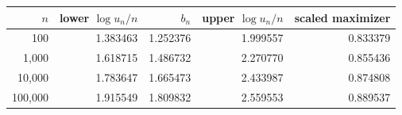 \begin{tabular}{rrrrr}
\toprule
$n$ & lower $\log u_n/n$ & $b_n$ & upper $\log u_n/n$ & scaled maximizer\\
\midrule
100 & 1.383463 & 1.252376 & 1.999557 & 0.833379\\
1,000 & 1.618715 & 1.486732 & 2.270770 & 0.855436\\
10,000 & 1.783647 & 1.665473 & 2.433987 & 0.874808\\
100,000 & 1.915549 & 1.809832 & 2.559553 & 0.889537\\
\bottomrule
\end{tabular}
